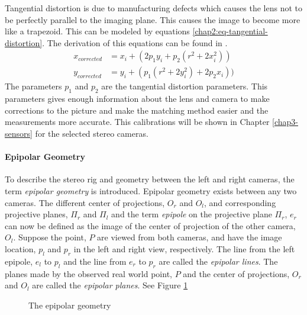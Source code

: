 Tangential distortion is due to manufacturing defects which causes the lens not to be
perfectly parallel to the imaging plane. This causes the image to become more like a
trapezoid. This can be modeled by equations \eqref{chap2:eq-tangential-distortion}. The
derivation of this equations can be found in \cite{brown66}.
\begin{equation}
    \label{chap2:eq-tangential-distortion}
    \begin{aligned}
        x_{corrected} &= x_i + (2 p_1 y_i + p_2 (r^2 + 2 x_i^2)) \\
        y_{corrected} &= y_i + ( p_1 (r^2 + 2 y_i^2) + 2 p_2 x_i))
    \end{aligned}
\end{equation}
The parameters $p_1$ and $p_2$ are the tangential distortion parameters. This parameters
gives enough information about the lens and camera to make corrections to the picture and
make the matching method easier and the measurements more accurate. This calibrations will
be shown in Chapter \ref{chap3-sensors} for the selected stereo cameras. 


\paragraph{Epipolar Geometry}
To describe the stereo rig and geometry between the left and right cameras, the term
\emph{epipolar geometry} is introduced. Epipolar geometry exists between any two cameras.
The different center of projections, $O_r$ and $O_l$, and corresponding
projective planes, $\Pi_r$ and $\Pi_l$ and the term \emph{epipole} on the projective plane
$\Pi_r$, $e_r$ can now be defined as the image of the center of projection of the other 
camera, $O_l$. Suppose the point, $P$ are viewed from both cameras, and have the image
location, $p_l$ and $p_r$ in the left and right view, respectively. The line from the left
epipole, $e_l$ to $p_l$ and the line from $e_r$ to $p_r$ are called the \emph{epipolar
lines}. The planes made by the observed real world point, $P$ and the center of
projections, $O_r$ and $O_l$ are called the \emph{epipolar planes}. See Figure
\ref{chap2:fig-epipolarGeometry}
\begin{figure}[htbp]
    \centering
    \caption{The epipolar geometry}
    \label{chap2:fig-epipolarGeometry}
\end{figure}

